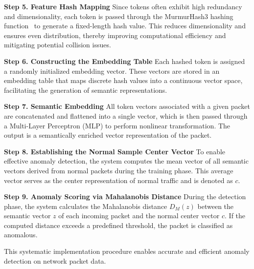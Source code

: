 \begin{ZhChapter}
\textbf{Step 5. Feature Hash Mapping}  
Since tokens often exhibit high redundancy and dimensionality, each token is passed through the MurmurHash3 hashing function~\label{fig: HashEmbedding} to generate a fixed-length hash value. This reduces dimensionality and ensures even distribution, thereby improving computational efficiency and mitigating potential collision issues.

\textbf{Step 6. Constructing the Embedding Table}  
Each hashed token is assigned a randomly initialized embedding vector. These vectors are stored in an embedding table that maps discrete hash values into a continuous vector space, facilitating the generation of semantic representations.

\textbf{Step 7. Semantic Embedding}  
All token vectors associated with a given packet are concatenated and flattened into a single vector, which is then passed through a Multi-Layer Perceptron (MLP) to perform nonlinear transformation. The output is a semantically enriched vector representation of the packet.

\textbf{Step 8. Establishing the Normal Sample Center Vector}  
To enable effective anomaly detection, the system computes the mean vector of all semantic vectors derived from normal packets during the training phase. This average vector serves as the center representation of normal traffic and is denoted as $c$.

\textbf{Step 9. Anomaly Scoring via Mahalanobis Distance}  
During the detection phase, the system calculates the Mahalanobis distance $D_M(z)$ between the semantic vector $z$ of each incoming packet and the normal center vector $c$. If the computed distance exceeds a predefined threshold, the packet is classified as anomalous.

This systematic implementation procedure enables accurate and efficient anomaly detection on network packet data.


\end{ZhChapter}